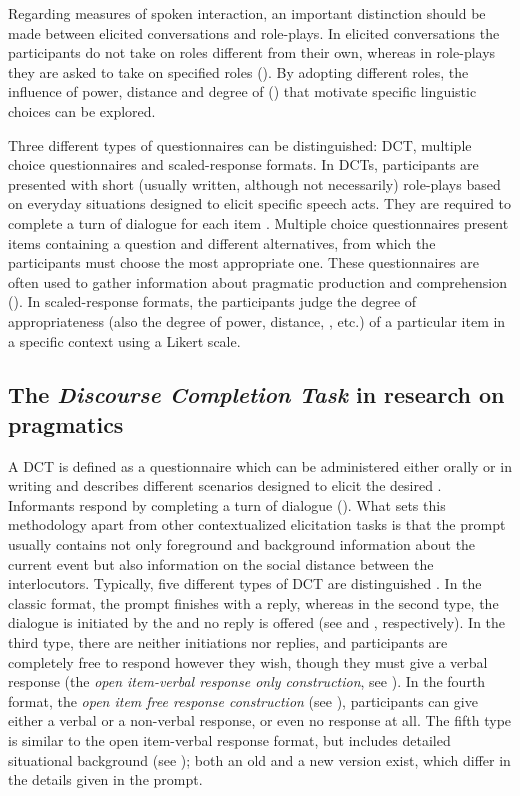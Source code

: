 \documentclass[output=paper]{LSP/langsci}
\begin{document}
Regarding {measures of spoken interaction}, an important distinction should be made between elicited conversations and role-plays. In elicited conversations the participants do not take on roles different from their own, whereas in role-plays they are asked to take on specified roles (\citealt{kasper2002}). By adopting different roles, the influence of power, distance and degree of  (\citealt{Brown1987}) that motivate specific linguistic choices can be explored.

Three different types of {questionnaires} can be distinguished: DCT, multiple choice questionnaires and scaled-response formats. In DCTs, participants are presented with short (usually written, although not necessarily) role-plays based on everyday situations designed to elicit specific speech acts. They are required to complete a turn of dialogue for each item \citep{Barron2003}. Multiple choice questionnaires present items containing a question and different alternatives, from which the participants must choose the most appropriate one. These questionnaires are often used to gather information about pragmatic production and comprehension  (\citealt{kasper2002}). In scaled-response formats, the participants judge the degree of appropriateness (also the degree of power, distance, , etc.) of a particular item in a specific context using a Likert scale.

\subsection{The \textit{Discourse Completion Task} in research on pragmatics}
\label{sec:van:1.2}
A DCT is defined as a questionnaire which can be administered either orally or in writing and describes different scenarios designed to elicit the desired . Informants respond by completing a turn of dialogue (\citealt{Kasper1991,Brown2001}). What sets this methodology apart from other contextualized elicitation tasks is that the prompt usually contains not only foreground and background information about the current event but also information on the social distance between the interlocutors. Typically, five different types of DCT are distinguished \citep{Nurani2009}. In the classic format, the prompt finishes with a reply, whereas in the second type, the dialogue is initiated by the  and no reply is offered (see  and , respectively). In the third type, there are neither  initiations nor replies, and participants are completely free to respond however they wish, though they must give a verbal response (the \textit{open item-verbal response only construction}, see ). In the fourth format, the \textit{open item free response construction} (see ),  participants can give either a verbal or a non-verbal response, or even no response at all. The fifth type is similar to the open item-verbal response format, but includes detailed situational background (see ); both an old and a new version exist, which differ in the details given in the prompt. 
\end{document}
